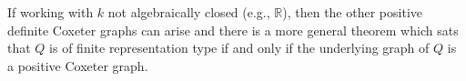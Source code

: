 If working with $k$ not algebraically closed (e.g., $\mathbb{R}$), then the
other positive definite Coxeter graphs can arise and there is a more general
theorem which sats that $Q$ is of finite representation type if and only if
the underlying graph of $Q$ is a positive Coxeter graph.
